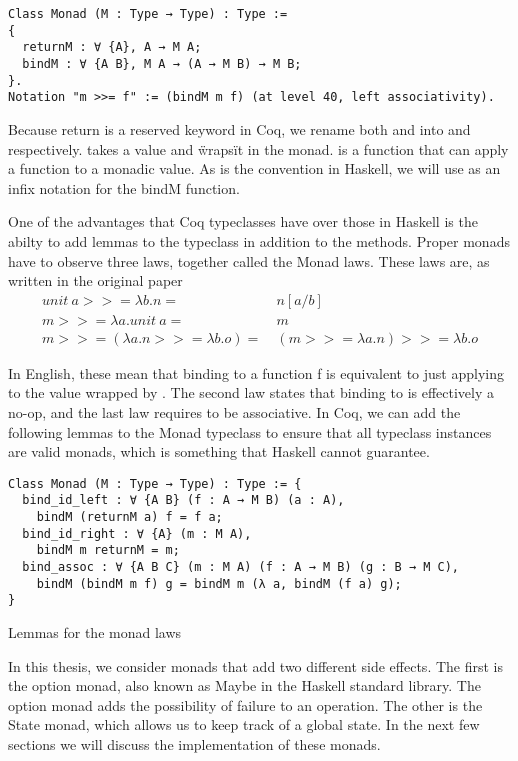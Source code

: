 \begin{verbatim}
Class Monad (M : Type → Type) : Type :=
{
  returnM : ∀ {A}, A → M A;
  bindM : ∀ {A B}, M A → (A → M B) → M B;
}.
Notation "m >>= f" := (bindM m f) (at level 40, left associativity).
\end{verbatim}

Because return is a reserved keyword in Coq, we rename both  and 
 into  and  respectively.
 takes a value and \"wraps\" it in the monad.  is
a function that can apply a function to a monadic value. As is the convention
in Haskell, we will use \coq{>>= } as an infix notation for the bindM
function.

One of the advantages that Coq typeclasses have over those in Haskell is the
abilty to add lemmas to the typeclass in addition to the methods. Proper monads
have to observe three laws, together called the Monad laws. These laws are, as
written in the original paper
\begin{align*}
    \textit{unit}\ a >>= \lambda b. n =&\ n[a/b] \\
    m >>= \lambda a . \textit{unit}\ a =&\ m \\
    m >>= (\lambda a.n >>= \lambda b.o) =&\ (m >>= \lambda a.n) >>= \lambda b.o
\end{align*}

In English, these mean that binding  to a function f is
equivalent to just applying  to the value wrapped by . The
second law states that binding to  is effectively a no-op, and
the last law requires  to be associative. In Coq, we can add the
following lemmas to the Monad typeclass to ensure that all typeclass instances
are valid monads, which is something that Haskell cannot guarantee. 

\begin{listing}[H]
\begin{verbatim}
Class Monad (M : Type → Type) : Type := {
  bind_id_left : ∀ {A B} (f : A → M B) (a : A), 
    bindM (returnM a) f = f a;
  bind_id_right : ∀ {A} (m : M A),
    bindM m returnM = m;
  bind_assoc : ∀ {A B C} (m : M A) (f : A → M B) (g : B → M C),
    bindM (bindM m f) g = bindM m (λ a, bindM (f a) g);
}
\end{verbatim}
\caption{Lemmas for the monad laws}
\label{lst:monad_lemmas}
\end{listing}

In this thesis, we consider monads that add two different side effects. The
first is the option monad, also known as Maybe in the Haskell standard library. 
The option monad adds the
possibility of failure to an operation. The other is the State monad, which
allows us to keep track of a global state. In the next few sections we will
discuss the implementation of these monads.

